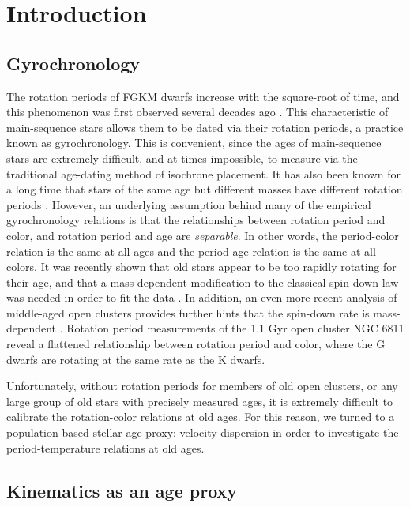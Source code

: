 \section{Introduction}

\subsection{Gyrochronology}
The rotation periods of FGKM dwarfs increase with the square-root of time, and
this phenomenon was first observed several decades ago \citep{skumanich1972}.
This characteristic of main-sequence stars allows them to be dated via their
rotation periods, a practice known as gyrochronology.
This is convenient, since the ages of main-sequence stars are extremely
difficult, and at times impossible, to measure via the traditional age-dating
method of isochrone placement.
It has also been known for a long time that stars of the same age but
different masses have different rotation periods .
However, an underlying assumption behind many of the empirical gyrochronology
relations \citep[\eg][]{barnes2003, barnes2007, mamajek2008, meibom2011,
angus2015, angus2019} is that the relationships between rotation period and
color, and rotation period and age are {\it separable}.
In other words, the period-color relation is the same at all ages and the
period-age relation is the same at all colors.
It was recently shown that old stars appear to be too rapidly rotating for
their age, \citep{angus2015, vansaders2016, vansaders2018} and that a
mass-dependent modification to the classical \citet{skumanich1972} spin-down
law was needed in order to fit the data \citep{vansaders2016, vansaders2018}.
In addition, an even more recent analysis of middle-aged open clusters
provides further hints that the spin-down rate is mass-dependent
\citep{curtis2019}.
Rotation period measurements of the 1.1 Gyr open cluster NGC 6811 reveal a
flattened relationship between rotation period and color, where the G dwarfs
are rotating at the same rate as the K dwarfs.

Unfortunately, without rotation periods for members of old open clusters, or
any large group of old stars with precisely measured ages, it is extremely
difficult to calibrate the rotation-color relations at old ages.
For this reason, we turned to a population-based stellar age proxy: velocity
dispersion in order to investigate the period-temperature relations at old
ages.

\subsection{Kinematics as an age proxy}


